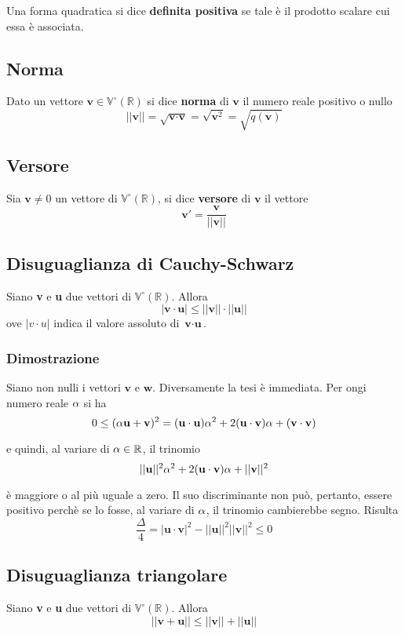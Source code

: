 \documentclass[../main.tex]{subfiles}
\begin{document}
Una forma quadratica si dice \textbf{definita positiva} se tale è il prodotto
scalare cui essa è associata.

\subsection{Norma}
Dato un vettore $\textbf{v}\in\mathbb{V}^{\circ}(\mathbb{R})$ si dice
\textbf{norma} di $\textbf{v}$ il numero reale positivo o nullo
\[
    ||\textbf{v}|| = \sqrt{\textbf{v}\cdot\textbf{v}} = \sqrt{\textbf{v}^2} = \sqrt{q(\textbf{v})}
\]

\subsection{Versore}
Sia $\textbf{v}\ne0$ un vettore di $\mathbb{V}^{\circ} (\mathbb{R})$, si dice
\textbf{versore} di $\textbf{v}$ il vettore
\[
    \textbf{v}' = \dfrac{\textbf{v}}{||\textbf{v}||}
\]

\subsection{Disuguaglianza di Cauchy-Schwarz}
Siano \textbf{v} e \textbf{u} due vettori di $\mathbb{V}^{\circ} (\mathbb{R})$.
Allora
\[
    |\textbf{v}\cdot\textbf{u}|\leq||\textbf{v}||\cdot||\textbf{u}||
\]
ove $|v\cdot u|$ indica il valore assoluto di $\textbf{v}\cdot\textbf{u}$.

\subsubsection{Dimostrazione}
Siano non nulli i vettori $\textbf{v}$ e $\textbf{w}$. Diversamente la tesi è immediata. Per ongi numero reale $\alpha$ si ha 
\[
    0\leq(\alpha\textbf{u}+\textbf{v})^2= (\textbf{u}\cdot\textbf{u})\alpha^2+2(\textbf{u}\cdot\textbf{v})\alpha+(\textbf{v}\cdot\textbf{v})\]

e quindi, al variare di $\alpha\in\mathbb{R}$, il trinomio
\[
    ||\textbf{u}||^2\alpha^2+2(\textbf{u}\cdot\textbf{v})\alpha+||\textbf{v}||^2
    \]

è maggiore o al più uguale a zero. Il suo discriminante non può, pertanto, essere positivo perchè se lo fosse, al variare di $\alpha$, il trinomio cambierebbe segno. Risulta
\[
    \dfrac{\Delta}{4} = |\textbf{u}\cdot\textbf{v}|^2 - ||\textbf{u}||^2||\textbf{v}||^2\leq0\]

\subsection{Disuguaglianza triangolare}
Siano \textbf{v} e \textbf{u} due vettori di $\mathbb{V}^{\circ} (\mathbb{R})$. Allora
\[
    ||\textbf{v}+\textbf{u}||\leq||\textbf{v}||+||\textbf{u}||
\]
\end{document}

